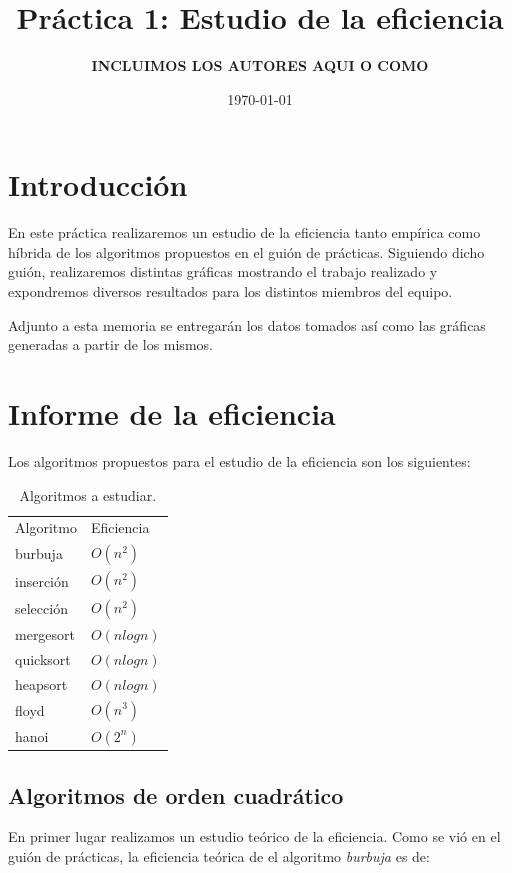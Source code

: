 \documentclass[11pt,a4paper]{article}
\title{Práctica 1: Estudio de la eficiencia}
\author{\textbf{INCLUIMOS LOS AUTORES AQUI O COMO}}
\date{\today}
\begin{document}
\maketitle

\section{Introducción}

En este práctica realizaremos un estudio de la eficiencia tanto empírica como híbrida de los algoritmos propuestos en el guión de prácticas. Siguiendo dicho guión, realizaremos distintas gráficas mostrando el trabajo realizado y expondremos diversos resultados para los distintos miembros del equipo.

Adjunto a esta memoria se entregarán los datos tomados así como las gráficas generadas a partir de los mismos.

\section{Informe de la eficiencia}

Los algoritmos propuestos para el estudio de la eficiencia son los siguientes:

\begin{table}[H]
	\centering
	\caption{Algoritmos a estudiar.}
	\label{my-label}
	\begin{tabular}{ll}
		Algoritmo & Eficiencia   \\
		burbuja   & $O(n^2)$     \\
		inserción & $O(n^2)$     \\
		selección & $O(n^2)$     \\
		mergesort & $O(n log n)$ \\
		quicksort & $O(n log n)$ \\
		heapsort  & $O(n log n)$ \\
		floyd     & $O(n^3)$     \\
		hanoi     & $O(2^n)$      
	\end{tabular}
\end{table}

\subsection{Algoritmos de orden cuadrático}

En primer lugar realizamos un estudio teórico de la eficiencia. Como se vió en el guión de prácticas, la eficiencia teórica de el algoritmo \emph{burbuja} es de:
\end{document}
